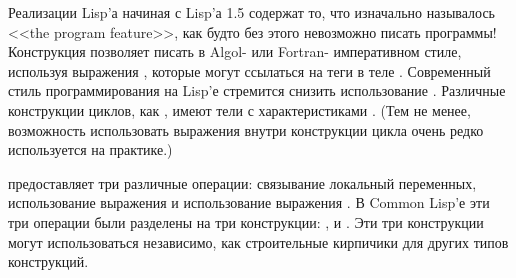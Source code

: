 Реализации Lisp'а начиная с Lisp'а 1.5 содержат то, что изначально называлось
<<the program feature>>, как будто без этого невозможно писать программы!
Конструкция  позволяет писать в Algol- или Fortran- императивном
стиле, используя выражения , которые могут ссылаться на теги в теле
. Современный стиль программирования на Lisp'е стремится снизить
использование . Различные конструкции циклов, как , имеют тели
с характеристиками .
(Тем не менее, возможность использовать выражения  внутри конструкции
цикла очень редко используется на практике.)

 предоставляет три различные операции:
связывание локальный переменных,
использование выражения 
и использование выражения .
В Common Lisp'е эти три операции были разделены на три конструкции:
,  и .
Эти три конструкции могут использоваться независимо, как строительные кирпичики
для других типов конструкций.

